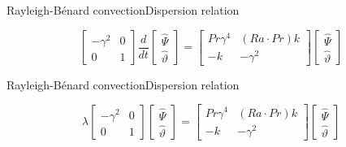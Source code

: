 \documentclass[usenames, dvipsnames, aspectratio=169]{beamer}
\begin{document}
\begin{frame}[t, c]{Rayleigh-Bénard convection}{Dispersion relation}
  \vfill
  \large

  \[
  \begin{bmatrix}
    -\gamma^2 & 0 \\
    0 & 1
  \end{bmatrix}
  \dfrac{d}{dt}
  \begin{bmatrix}
    \hat{\Psi} \\ \hat{\vartheta}
  \end{bmatrix}
  =
  \begin{bmatrix}
    Pr \gamma^4 & \left( Ra \cdot Pr \right) k \\
    -k & -\gamma^2
  \end{bmatrix}
  \begin{bmatrix}
    \hat{\Psi} \\ \hat{\vartheta}
  \end{bmatrix}
  \]

  \vfill
\end{frame}

\begin{frame}[t, c]{Rayleigh-Bénard convection}{Dispersion relation}
  \vfill
  \large

  \[
  \lambda
  \begin{bmatrix}
    -\gamma^2 & 0 \\
    0 & 1
  \end{bmatrix}
  \begin{bmatrix}
    \hat{\Psi} \\ \hat{\vartheta}
  \end{bmatrix}
  =
  \begin{bmatrix}
    Pr \gamma^4 & \left( Ra \cdot Pr \right) k \\
    -k & -\gamma^2
  \end{bmatrix}
  \begin{bmatrix}
    \hat{\Psi} \\ \hat{\vartheta}
  \end{bmatrix}
  \]

  \vfill
\end{frame}
\end{document}
